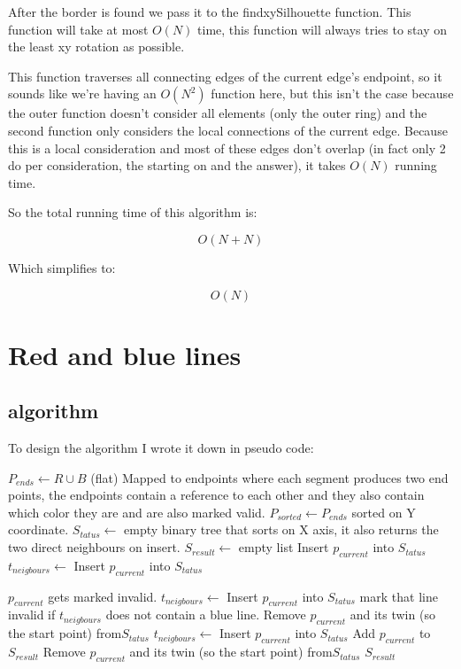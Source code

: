 \documentclass{article}
\begin{document}
After the border is found we pass it to the findxySilhouette function.
This function will take at most $O(N)$ time, this function will always
tries to stay on the least xy rotation as possible.

This function traverses all connecting edges of the current edge's endpoint,
so it sounds like we're having an $O(N^2)$ function here, but this isn't the
case because the outer function doesn't consider all elements
(only the outer ring) and the second function only considers the local
connections of the current edge. Because this is a local consideration
and most of these edges don't overlap (in fact only 2 do per consideration,
the starting on and the answer), it takes $O(N)$ running time.

So the total running time of this algorithm is:

\[ O(N+N) \]

Which simplifies to:

\[ O(N)\]

\section{Red and blue lines}
\subsection{algorithm}
To design the algorithm I wrote it down in pseudo code:
\begin{algorithmic}[1]
	\State
	$P_{ends} \gets R \cup B$ (flat) Mapped to endpoints where each segment
	produces two end points, the endpoints contain a reference to each other
	and they also contain which color they are and are also marked
	valid.
	\State
	$P_{sorted} \gets P_{ends}$ sorted on Y coordinate.
	\State
	$S_{tatus} \gets $ empty binary tree that sorts on X axis, it also
	returns the two direct neighbours on insert.
	\State
	$S_{result} \gets $ empty list
			Insert $p_{current}$ into $S_{tatus}$
		\State
			\State
			$t_{neigbours} \gets $ Insert $p_{current}$ into $S_{tatus}$

				\State
				$p_{current}$ gets marked invalid.
			\EndIf
		\State
			\State
			$t_{neigbours} \gets $ Insert $p_{current}$ into
			$S_{tatus}$
				\State
				mark that line invalid if $t_{neigbours}$ does
				not contain a blue line.
			\EndIf
			\State
			Remove $p_{current}$ and its twin (so the start point) from$S_{tatus}$
		\State
			\State
			$t_{neigbours} \gets $ Insert $p_{current}$ into
			$S_{tatus}$
				Add $p_{current}$ to $S_{result}$
			\EndIf
			\State
			Remove $p_{current}$ and its twin (so the start point) from$S_{tatus}$
		\EndIf
	\EndFor
	\State
	\Return $S_{result}$
\end{algorithmic}
\end{document}
